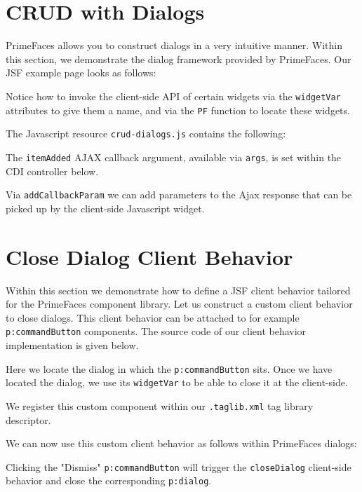 \section{CRUD with Dialogs}
PrimeFaces allows you to construct dialogs in a very intuitive manner.
Within this section, we demonstrate the dialog framework provided by PrimeFaces.
Our JSF example page looks as follows:

Notice how to invoke the client-side API of certain widgets via the \texttt{widgetVar} attributes to give them a name, and via the \texttt{PF} function to locate these widgets.

The Javascript resource \texttt{crud-dialogs.js} contains the following:

The \texttt{itemAdded} AJAX callback argument, available via \texttt{args}, is set within the CDI controller below.


Via \texttt{addCallbackParam} we can add parameters to the Ajax response that can be picked up by the client-side Javascript widget.

\section{Close Dialog Client Behavior}
Within this section we demonstrate how to define a JSF client behavior tailored for the PrimeFaces component library.
Let us construct a custom client behavior to close dialogs.
This client behavior can be attached to for example \texttt{p:commandButton} components.
The source code of our client behavior implementation is given below.

Here we locate the dialog in which the \texttt{p:commandButton} sits.
Once we have located the dialog, we use its \texttt{widgetVar} to be able to close it at the client-side.

We register this custom component within our \texttt{.taglib.xml} tag library descriptor.


We can now use this custom client behavior as follows within PrimeFaces dialogs:

Clicking the "Dismiss" \texttt{p:commandButton} will trigger the \texttt{closeDialog} client-side behavior and close the corresponding \texttt{p:dialog}.

